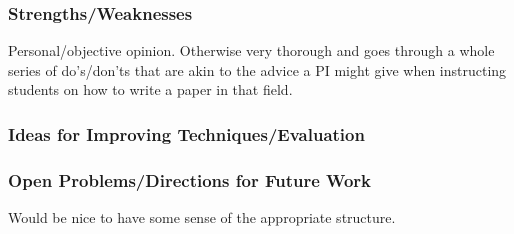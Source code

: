 \subsubsection{Strengths/Weaknesses}

Personal/objective opinion. Otherwise very thorough and goes through a whole series of do's/don'ts that are akin to the advice a PI might give when instructing students on how to write a paper in that field.

\subsubsection{Ideas for Improving Techniques/Evaluation}

\subsubsection{Open Problems/Directions for Future Work}

Would be nice to have some sense of the appropriate structure.
